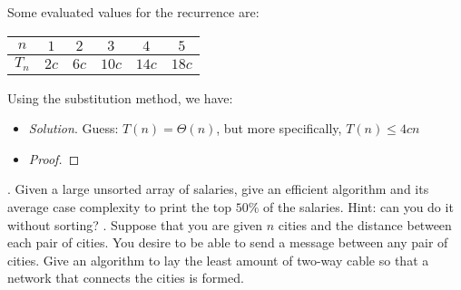 \documentclass{scrartcl}
\begin{document}
\begin{flushleft}
    Some evaluated values for the recurrence are:
    \medskip
    \begin{center}
        \begin{tabular}{|c|c|c|c|c|c|}
            \hline
            $n$ & $1$ & $2$ & $3$ & $4$ & $5$ \\
            \hline
            $T_n$ & $2c$ & $6c$ & $10c$ & $14c$ & $18c$ \\
            \hline
        \end{tabular}
    \end{center}
    \medskip
    Using the substitution method, we have:\\
    \begin{itemize}
        \item \textit{Solution}. Guess: $T(n) = \Theta(n)$, but more specifically, $T(n) \leq 4cn$
        \item \begin{proof}
              \end{proof}
    \end{itemize}
    . Given a large unsorted array of salaries, give an efficient algorithm and its average case
    complexity to print the top $50\%$ of the salaries. Hint: can you do it without sorting?
    . Suppose that you are given $n$ cities and the distance between each pair of cities. You
    desire to be able to send a message between any pair of cities. Give an algorithm to lay the
    least amount of two-way cable so that a network that connects the cities is formed.

\end{flushleft}
\end{document}
